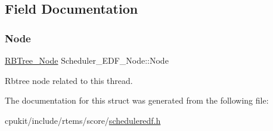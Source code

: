 \subsection{Field Documentation}
\mbox{\label{structScheduler__EDF__Node_acbdb5103aad0be2385bbfc89b7d730b3}} 
\subsubsection{\texorpdfstring{Node}{Node}}
{\footnotesize\ttfamily \mbox{\hyperlink{structRBTree__Node}{R\+B\+Tree\+\_\+\+Node}} Scheduler\+\_\+\+E\+D\+F\+\_\+\+Node\+::\+Node}

Rbtree node related to this thread. 

The documentation for this struct was generated from the following file\+:\begin{DoxyCompactItemize}
\item 
cpukit/include/rtems/score/\mbox{\hyperlink{scheduleredf_8h}{scheduleredf.\+h}}\end{DoxyCompactItemize}
